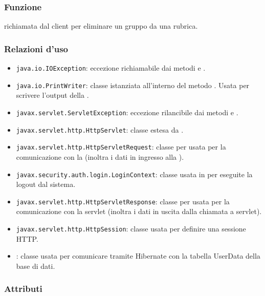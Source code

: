 

\subsubsection*{Funzione}
 richiamata dal client per eliminare un gruppo da una rubrica.

\subsubsection*{Relazioni d'uso}

\begin{itemize}
	\item \texttt{java.io.IOException}: eccezione richiamabile dai metodi  e .
	\item \texttt{java.io.PrintWriter}: classe istanziata all'interno del metodo . Usata per scrivere l'output della .
	\item \texttt{javax.servlet.ServletException}: eccezione rilancibile dai metodi  e .
	\item \texttt{javax.servlet.http.HttpServlet}: classe estesa da .
	\item \texttt{javax.servlet.http.HttpServletRequest}:  classe per usata per la comunicazione con la  (inoltra i dati in ingresso alla ).
	\item \texttt{javax.security.auth.login.LoginContext}: classe usata in  per eseguite la logout dal sistema.
	\item \texttt{javax.servlet.http.HttpServletResponse}: classe per usata per la comunicazione con la servlet (inoltra i dati in uscita dalla chiamata a servlet).
	\item \texttt{javax.servlet.http.HttpSession}: classe usata per definire una sessione HTTP.
	\item {}: classe usata per comunicare tramite Hibernate con la tabella UserData della base di dati.
\end{itemize}

\subsubsection*{Attributi}

